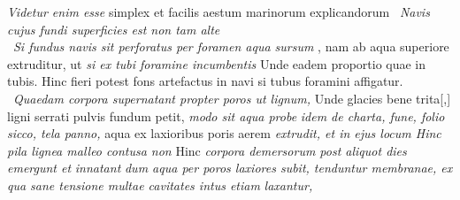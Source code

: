 \textit{Videtur enim esse} simplex et facilis aestum marinorum explicandorum
\pend 
\count{}
\count{}
\count{}
\pstart 
{} \,
\textit{Navis cujus fundi superficies
est non tam alte }\\
\indent
{} \,
\textit{Si fundus navis sit perforatus per foramen aqua sursum }, nam ab aqua superiore extruditur, ut \textit{si ex tubi foramine incumbentis }
Unde eadem proportio quae in tubis. Hinc fieri potest fons artefactus in navi si tubus foramini affigatur.\\
\indent
{} \,
\textit{Quaedam corpora supernatant propter poros ut lignum, } Unde glacies bene trita[,]
ligni serrati pulvis fundum petit,
\textit{modo sit aqua probe}
\textit{idem de charta, fune, folio sicco\protect{}, tela panno,}
aqua ex laxioribus poris aerem
\textit{extrudit, et in ejus locum 
Hinc pila lignea\protect{} malleo contusa non }
Hinc \textit{corpora demersorum post aliquot dies emergunt et} \textit{innatant} 
\textit{dum aqua per poros laxiores subit, tenduntur membranae, ex qua sane tensione multae cavitates intus etiam} \textit{laxantur,} 
